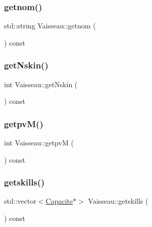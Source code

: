 \mbox{\label{class_vaisseau_a8a89c0460cfb153545865972d16a97a1}} 
\subsubsection{\texorpdfstring{getnom()}{getnom()}}
{\footnotesize\ttfamily std\+::string Vaisseau\+::getnom (\begin{DoxyParamCaption}{ }\end{DoxyParamCaption}) const\hspace{0.3cm}{\ttfamily [inline]}}

\mbox{\label{class_vaisseau_ae8ddd0960343a3e8aeeecff3d5f23a3d}} 
\subsubsection{\texorpdfstring{get\+Nskin()}{getNskin()}}
{\footnotesize\ttfamily int Vaisseau\+::get\+Nskin (\begin{DoxyParamCaption}{ }\end{DoxyParamCaption}) const\hspace{0.3cm}{\ttfamily [inline]}}

\mbox{\label{class_vaisseau_a1483929f8c93da31f375481f135b8272}} 
\subsubsection{\texorpdfstring{getpv\+M()}{getpvM()}}
{\footnotesize\ttfamily int Vaisseau\+::getpvM (\begin{DoxyParamCaption}{ }\end{DoxyParamCaption}) const\hspace{0.3cm}{\ttfamily [inline]}}

\mbox{\label{class_vaisseau_ad9145b4de46f5bcf525fd5cafae42fc9}} 
\subsubsection{\texorpdfstring{getskills()}{getskills()}}
{\footnotesize\ttfamily std\+::vector$<$\hyperlink{class_capacite}{Capacite}$\ast$$>$ Vaisseau\+::getskills (\begin{DoxyParamCaption}{ }\end{DoxyParamCaption}) const\hspace{0.3cm}{\ttfamily [inline]}}

